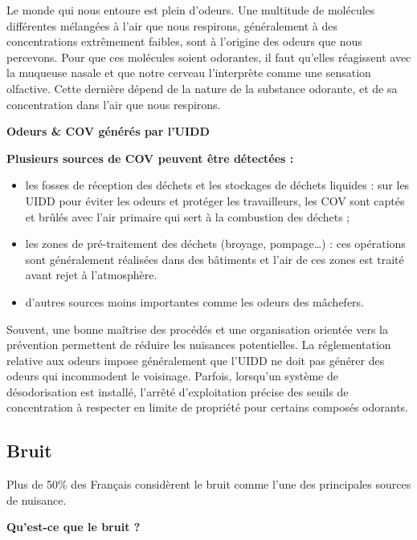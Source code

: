 Le monde qui nous entoure est plein d'odeurs. Une multitude de molécules différentes mélangées à l’air que nous respirons, généralement à des concentrations extrêmement faibles, sont à l’origine des odeurs que nous percevons. Pour que ces molécules soient odorantes, il faut qu’elles réagissent avec la muqueuse nasale et que notre cerveau l’interprète comme une sensation olfactive. Cette dernière dépend de la nature de la substance odorante, et de sa concentration dans l’air que nous respirons.


\vspace{0.3cm}

\textbf{Odeurs \& COV générés par l'UIDD}
\vspace{0.3cm}

\textbf{Plusieurs sources de COV peuvent être détectées :}


\begin{itemize}

\item	les fosses de réception des déchets et les stockages de déchets liquides : sur les UIDD pour éviter les odeurs et protéger les travailleurs, les COV sont captés et brûlés avec l’air primaire qui sert à la combustion des déchets ;
\item		les zones de pré-traitement des déchets (broyage, pompage…) : ces opérations sont généralement réalisées dans des bâtiments et l’air de ces zones est traité avant rejet à l’atmosphère.
\item	d’autres sources moins importantes comme les odeurs des mâchefers.

\end{itemize}

Souvent, une bonne maîtrise des procédés et une organisation orientée vers la prévention permettent de réduire les nuisances potentielles. 
La réglementation relative aux odeurs impose généralement que l’UIDD ne doit pas 
générer des odeurs qui incommodent le voisinage. Parfois, lorsqu’un système de désodorisation est installé, l’arrêté d’exploitation précise des seuils de concentration à respecter en limite de propriété pour certains composés odorants. 


\subsection{Bruit}

Plus de 50\% des Français considèrent le bruit comme l'une des principales sources de nuisance.

\vspace{0.3cm}
\textbf{Qu'est-ce que le bruit ?}
\vspace{0.3cm} 

